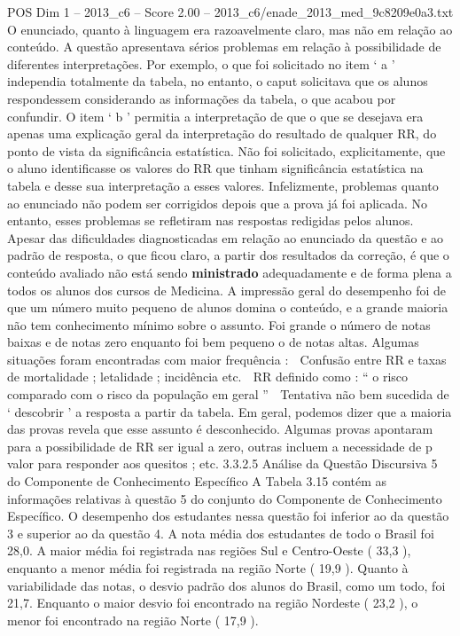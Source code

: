 \begin{textsample}{POS Dim 1 – 2013\_c6 – Score 2.00 – 2013\_c6/enade\_2013\_med\_9c8209e0a3.txt}
O enunciado, quanto à linguagem era razoavelmente claro, mas não em relação ao conteúdo.
A questão apresentava sérios problemas em relação à possibilidade de diferentes interpretações.
Por exemplo, o que foi solicitado no item ‘ a ’ independia totalmente da tabela, no entanto, o caput solicitava que os alunos respondessem considerando as informações da tabela, o que acabou por confundir.
O item ‘ b ’ permitia a interpretação de que o que se desejava era apenas uma explicação geral da interpretação do resultado de qualquer RR, do ponto de vista da significância estatística.
Não foi solicitado, explicitamente, que o aluno identificasse os valores do RR que tinham significância estatística na tabela e desse sua interpretação a esses valores.
Infelizmente, problemas quanto ao enunciado não podem ser corrigidos depois que a prova já foi aplicada.
No entanto, esses problemas se refletiram nas respostas redigidas pelos alunos.
Apesar das dificuldades diagnosticadas em relação ao enunciado da questão e ao padrão de resposta, o que ficou claro, a partir dos resultados da correção, é que o conteúdo avaliado não está sendo \textbf{ministrado} adequadamente e de forma plena a todos os alunos dos cursos de Medicina.
A impressão geral do desempenho foi de que um número muito pequeno de alunos domina o conteúdo, e a grande maioria não tem conhecimento mínimo sobre o assunto.
Foi grande o número de notas baixas e de notas zero enquanto foi bem pequeno o de notas altas.
Algumas situações foram encontradas com maior frequência :  Confusão entre RR e taxas de mortalidade ; letalidade ; incidência etc.  RR definido como : “ o risco comparado com o risco da população em geral ”  Tentativa não bem sucedida de ‘ descobrir ’ a resposta a partir da tabela.
Em geral, podemos dizer que a maioria das provas revela que esse assunto é desconhecido.
Algumas provas apontaram para a possibilidade de RR ser igual a zero, outras incluem a necessidade de p valor para responder aos quesitos ; etc. 3.3.2.5 Análise da Questão Discursiva 5 do Componente de Conhecimento Específico A Tabela 3.15 contém as informações relativas à questão 5 do conjunto do Componente de Conhecimento Específico.
O desempenho dos estudantes nessa questão foi inferior ao da questão 3 e superior ao da questão 4.
A nota média dos estudantes de todo o Brasil foi 28,0.
A maior média foi registrada nas regiões Sul e Centro-Oeste ( 33,3 ), enquanto a menor média foi registrada na região Norte ( 19,9 ).
Quanto à variabilidade das notas, o desvio padrão dos alunos do Brasil, como um todo, foi 21,7.
Enquanto o maior desvio foi encontrado na região Nordeste ( 23,2 ), o menor foi encontrado na região Norte ( 17,9 ).

\end{textsample}
